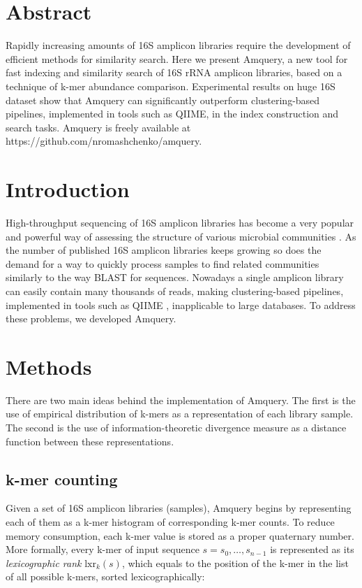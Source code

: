 \documentclass[10pt,letterpaper]{article}
\begin{document}
\section*{Abstract}
Rapidly increasing amounts of 16S amplicon libraries require the development of efficient methods for similarity search. 
Here we present Amquery, a new tool for fast indexing and similarity search of 16S rRNA amplicon libraries, based on a technique of k-mer abundance comparison.
Experimental results on huge 16S dataset show that Amquery can significantly outperform clustering-based pipelines, implemented in tools such as QIIME, in the index construction and search tasks. 
Amquery is freely available at https://github.com/nromashchenko/amquery.

\linenumbers

\section*{Introduction}
High-throughput sequencing of 16S amplicon libraries has become a very popular and powerful way of assessing the structure of various microbial communities \cite{qin2010human, seedorf2014bacteria, ligi2014characterization}.
As the number of published 16S amplicon libraries keeps growing so does the demand for a way to quickly process samples to find related communities similarly to the way BLAST for sequences. Nowadays a single amplicon library can easily contain many thousands of reads, making clustering-based pipelines, implemented in tools such as QIIME \cite{caporaso2010qiime}, inapplicable to large databases. To address these problems, we developed Amquery.


\section*{Methods}
There are two main ideas behind the implementation of Amquery. The first is the use of empirical distribution of k-mers as a representation of each library sample. The second is the use of information-theoretic divergence measure as a distance function between these representations. 

\subsection*{k-mer counting}
Given a set of 16S amplicon libraries (samples), Amquery begins by representing each of them as a k-mer histogram of corresponding k-mer counts. To reduce memory consumption, each k-mer value is stored as a proper quaternary number.
More formally, every k-mer of input sequence $s = s_0,\dots,s_{n-1}$ is represented as its \textit{lexicographic rank} $\mathrm{lxr}_k(s)$, which equals to the position of the k-mer in the list of all possible k-mers, sorted lexicographically:
\end{document}
